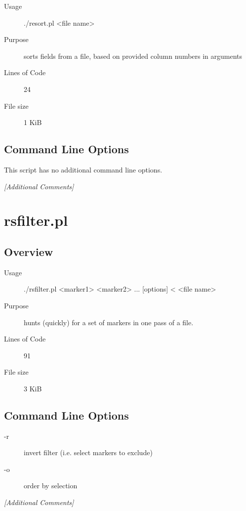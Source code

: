 \begin{description}
\item[Usage] ./resort.pl <file name>
\item[Purpose] sorts fields from a file, based on provided column numbers in arguments
\item[Lines of Code] 24
\item[File size] 1 KiB
\end{description}

\subsection{Command Line Options}
\label{sec:resort.pl-command-line}

This script has no additional command line options.

\emph{[Additional Comments]}

\section{rsfilter.pl}
\label{sec:rsfilter.pl}

\subsection{Overview}
\label{sec:rsfilter.pl-overview}

\begin{description}
\item[Usage] ./rsfilter.pl <marker1> <marker2> ... [options] < <file name>
\item[Purpose] hunts (quickly) for a set of markers in one pass of a file.
\item[Lines of Code] 91
\item[File size] 3 KiB
\end{description}

\subsection{Command Line Options}
\label{sec:rsfilter.pl-command-line}

\begin{description}
\item[-r] invert filter (i.e. select markers to exclude)
\item[-o] order by selection
\end{description}

\emph{[Additional Comments]}

